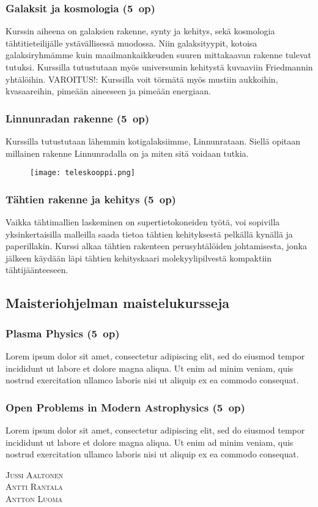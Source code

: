 \documentclass[../ala_hataile.tex]{subfiles}
\begin{document}
\subsubsection*{Galaksit ja kosmologia (5~op)}
Kurssin aiheena on galaksien rakenne,
synty ja kehitys, sekä kosmologia tähtitieteilijälle
ystävällisessä muodossa. Niin galaksityypit,
kotoisa galaksiryhmämme kuin
maailmankaikkeuden suuren mittakaavan
rakenne tulevat tutuksi. Kurssilla tutustutaan
myös universumin kehitystä kuvaaviin
Friedmannin yhtälöihin. VAROITUS!:
Kurssilla voit törmätä myös mustiin aukkoihin,
kvasaareihin, pimeään aineeseen ja
pimeään energiaan.
\subsubsection*{Linnunradan rakenne (5~op)}
Kurssilla tutustutaan lähemmin kotigalaksiimme,
Linnunrataan. Siellä opitaan
millainen rakenne Linnunradalla on ja miten
sitä voidaan tutkia.

\begin{figure}
	\texttt{[image: teleskooppi.png]}
\end{figure}
\subsubsection*{Tähtien rakenne ja kehitys (5~op)}
Vaikka tähtimallien laskeminen on supertietokoneiden
työtä, voi sopivilla yksinkertaisilla
malleilla saada tietoa tähtien kehityksestä
pelkällä kynällä ja paperillakin.
Kurssi alkaa tähtien rakenteen perusyhtälöiden
johtamisesta, jonka jälkeen käydään
läpi tähtien kehityskaari molekyylipilvestä
kompaktiin tähtijäänteeseen.

\subsection*{Maisteriohjelman maistelukursseja}
\subsubsection*{Plasma Physics (5~op)}
Lorem ipsum dolor sit amet, consectetur adipiscing elit, sed do eiusmod tempor incididunt ut labore et dolore magna aliqua. Ut enim ad minim veniam, quis nostrud exercitation ullamco laboris nisi ut aliquip ex ea commodo consequat.
\subsubsection*{Open Problems in Modern Astrophysics (5~op)}
Lorem ipsum dolor sit amet, consectetur adipiscing elit, sed do eiusmod tempor incididunt ut labore et dolore magna aliqua. Ut enim ad minim veniam, quis nostrud exercitation ullamco laboris nisi ut aliquip ex ea commodo consequat.

\vspace{0.5cm}
\noindent
\textsc{Jussi Aaltonen}\\
\textsc{Antti Rantala}\\
\textsc{Antton Luoma}
\end{document}
